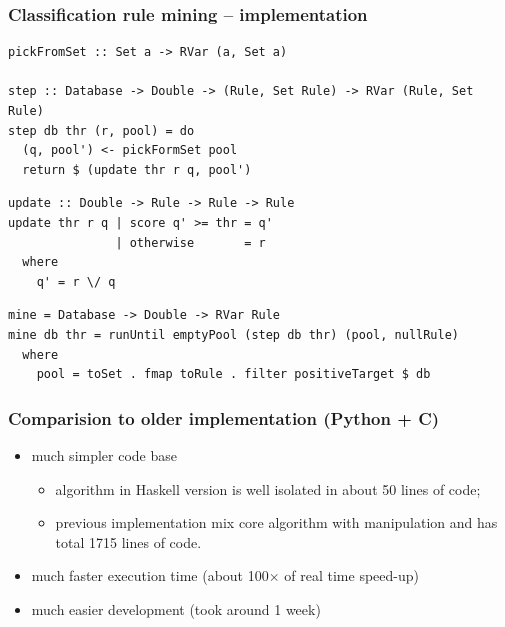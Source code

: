 \documentclass[mathserif, 8pt]{beamer}
\def\fs{\vskip0ex}
\begin{document}
\begin{frame}[fragile]
  \frametitle{Classification rule mining -- implementation}


\begin{verbatim}
pickFromSet :: Set a -> RVar (a, Set a)

step :: Database -> Double -> (Rule, Set Rule) -> RVar (Rule, Set Rule)
step db thr (r, pool) = do
  (q, pool') <- pickFormSet pool
  return $ (update thr r q, pool')
\end{verbatim}
  \pause
\begin{verbatim}
update :: Double -> Rule -> Rule -> Rule
update thr r q | score q' >= thr = q'
               | otherwise       = r
  where
    q' = r \/ q
\end{verbatim}
  \pause
\begin{verbatim}
mine = Database -> Double -> RVar Rule
mine db thr = runUntil emptyPool (step db thr) (pool, nullRule)
  where
    pool = toSet . fmap toRule . filter positiveTarget $ db
\end{verbatim}
\end{frame}

\begin{frame}
  \frametitle{Comparision to older implementation (Python + C)}
  \begin{itemize}
  \item much simpler code base
    \begin{itemize}
    \item algorithm in Haskell version is well isolated in about 50 lines of code;
    \item previous implementation mix core algorithm with manipulation and has
      total 1715 lines of code.
    \end{itemize}
  \item much faster execution time (about 100$\times$ of real time speed-up)
  \item much easier development (took around 1 week)
  \end{itemize}
\end{frame}
\end{document}
